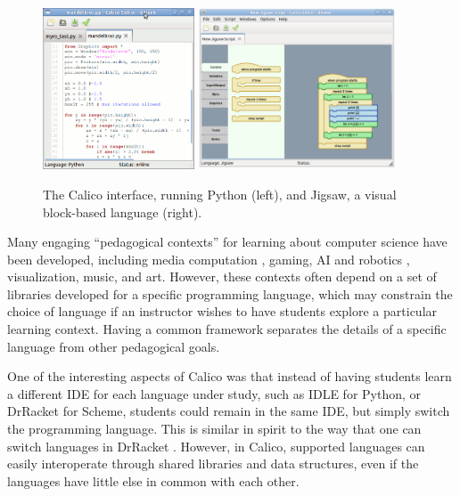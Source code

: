 \documentclass[acmsmall,screen,authorversion]{acmart}
\begin{document}
\begin{figure}[h]
  \centering
  \includegraphics[width=0.40\textwidth]{calico-interface-python.jpg}
  \hspace{0.15in}
  \includegraphics[width=0.523\textwidth]{calico-interface-jigsaw.jpg}
  \caption{The Calico interface, running Python (left),
    and Jigsaw, a visual block-based language (right).}
  \label{fig:calico}
\end{figure}


Many engaging ``pedagogical contexts'' for learning about
computer science have been developed, including media computation
\cite{Guzdial03}, gaming, AI and robotics \cite{Myro}, visualization, music,
and art.  However, these contexts often depend on a set of libraries developed
for a specific programming language, which may constrain the choice of language
if an instructor wishes to have students explore a particular learning
context. Having a common framework separates the details of a specific language
from other pedagogical goals.

One of the interesting aspects of Calico was that instead of having
students learn a different IDE for each language under study, such as
IDLE for Python, or DrRacket for Scheme, students could remain in the
same IDE, but simply switch the programming language. This is similar
in spirit to the way that one can switch languages in DrRacket \cite{Racket}.
However, in Calico, supported languages can easily interoperate through shared
libraries and data structures, even if the languages have little else in common
with each other.
\end{document}
